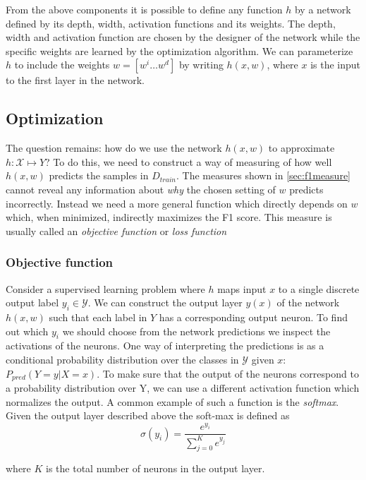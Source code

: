 From the above components it is possible to define any function $h$ by a network defined by its depth, width, activation functions and its weights. The depth, width and activation function are chosen by the designer of the network while the specific weights are learned by the optimization algorithm. We can parameterize $h$ to include the weights $w = [w^i \ldots w^d ]$ by writing $h(x,w)$, where $x$ is the input to the first layer in the network.

\subsection{Optimization}
\label{nn_optimization}
 
The question remains: how do we use the network $h(x,w)$ to approximate $h:\mathcal{X}\mapsto{Y}$? To do this, we need to construct a way of measuring of how well $h(x,w)$ predicts the samples in $D_{train}$. The measures shown in \autoref{sec:f1measure} cannot reveal any information about \emph{why} the chosen setting of $w$ predicts incorrectly. Instead we need a more general function which directly depends on $w$ which, when minimized, indirectly maximizes the F1 score. This measure is usually called an \emph{objective function} or \emph{loss function} 

\subsubsection{Objective function}
Consider a supervised learning problem where $h$ maps input $x$ to a single discrete output label $y_i \in \mathcal{Y}$. We can construct the output layer $y(x)$ of the network $h(x,w)$ such that each label in $Y$ has a corresponding output neuron. To find out which $y_i$  we should choose from the network predictions we inspect the activations of the neurons. One way of interpreting the predictions is as a conditional probability distribution over the classes in $\mathcal{Y}$ given $x$: $P_{pred}(Y = y | X = x)$. To make sure that the output of the neurons correspond to a probability distribution over Y, we can use a different activation function which normalizes the output. A common example of such a function is the \emph{softmax}. Given the output layer described above the soft-max is defined as 
\begin{equation}
\sigma(y_i) = \frac{e^{y_i}} {\sum_{j=0}^K e^{y_j}} \label{eq:softmax}
\end{equation}

where $K$ is the total number of neurons in the output layer.

